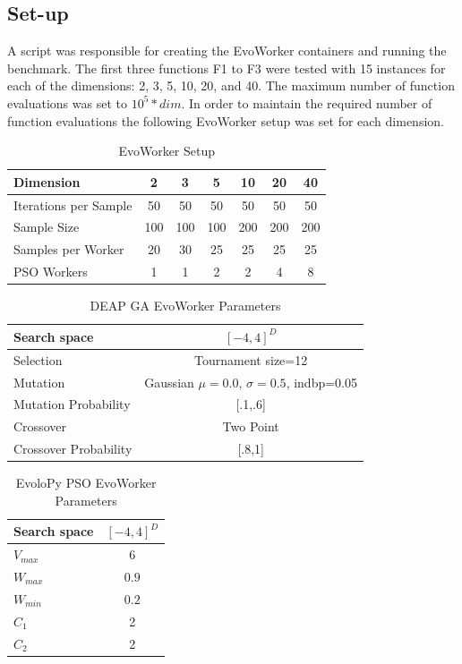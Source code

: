\subsection{Set-up}
\label{sec:evoworkers}

A script was responsible for creating the EvoWorker 
containers and running the benchmark. The first three functions 
F1 to F3 were tested with 15 instances for each of 
the dimensions: 2, 3, 5, 10, 20, and 40. 
The maximum number of function evaluations was set to $10^5*dim$. 
In order to maintain the required number of function 
evaluations the following EvoWorker setup was set for
each dimension.

\begin{table}
  \small
  \caption{EvoWorker Setup}
  \label{tab:params} 
  \centering
  \small
  \begin{tabular}{|l|c|c|c|c|c|c|}
    \hline
    Dimension & 2 & 3 & 5 & 10 & 20 & 40\\ \hline
    Iterations per Sample  & 50 & 50 & 50 & 50 & 50 & 50\\ \hline
    Sample Size  & 100 & 100 & 100 & 200 & 200 & 200 \\ \hline
    Samples per Worker & 20 & 30 & 25 & 25 & 25 & 25  \\ \hline
    PSO Workers & 1 & 1 & 2 & 2 & 4 & 8  \\ \hline
  \end{tabular}
\end{table}



\begin{table}
  \small
  \caption{ DEAP GA EvoWorker Parameters }
  \label{tab:GAparams} 
  \centering
  \small
  \begin{tabular}{|l|c|}
    \hline
    Search space &  $[-4,4]^{D}$ \\ \hline
    Selection & Tournament size=12\\ \hline
    Mutation & Gaussian $\mu=0.0$, $\sigma=0.5$, indbp=0.05  \\ \hline
    Mutation Probability & [.1,.6]  \\ \hline
    Crossover & Two Point  \\ \hline
    Crossover Probability& [.8,1]  \\ \hline
  \end{tabular}
\end{table}

\begin{table}
  \small
  \caption{ EvoloPy PSO EvoWorker Parameters }
  \label{tab:GAparams} 
  \centering
  \small
  \begin{tabular}{|l|c|}
    \hline
    Search space &  $[-4,4]^{D}$ \\ \hline
    $V_{max}$ & 6 \\ \hline
    $W_{max}$ & $0.9$ \\ \hline
    $W_{min}$ & $0.2$ \\ \hline
    $C_1$ & 2 \\ \hline
    $C_2$ & 2 \\ \hline
  \end{tabular}
\end{table}


